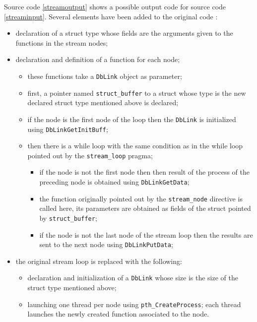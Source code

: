 \documentclass [A4]{article}
\begin{document}
	Source code \ref{streamoutput} shows a possible output code for source code \ref{streaminput}. Several elements have been added to the original code :
	\begin{itemize}
		\item declaration of a struct type whose fields are the arguments given to the functions in the stream nodes;
		\item declaration and definition of a function for each node; 
		\begin{itemize}
			\item these functions take a \verb+DbLink+ object as parameter;
			\item first, a pointer named \verb+struct_buffer+ to a struct whose type is the new declared struct type mentioned above is declared;
			\item if the node is the first node of the loop then the \verb+DbLink+ is initialized using \verb+DbLinkGetInitBuff+;
			\item then there is a while loop with the same condition as in the while loop pointed out by the \verb+stream_loop+ pragma;
			\begin{itemize}
				\item if the node is not the first node then then result of the process of the preceding node is obtained using \verb+DbLinkGetData+;
				\item the function originally pointed out by the \verb+stream_node+ directive is called here, its parameters are obtained as fields of the struct pointed by \verb+struct_buffer+;
				\item if the node is not the last node of the stream loop then the results are sent to the next node using \verb+DbLinkPutData+;
			\end{itemize}
		\end{itemize}
		\item the original stream loop is replaced with the following:
		\begin{itemize}
			\item declaration and initialization of a \verb+DbLink+ whose size is the size of the struct type mentioned above;
			\item launching one thread per node using \verb+pth_CreateProcess+; each thread launches the newly created function associated to the node.
		\end{itemize}
	\end{itemize}
	
\end{document}
